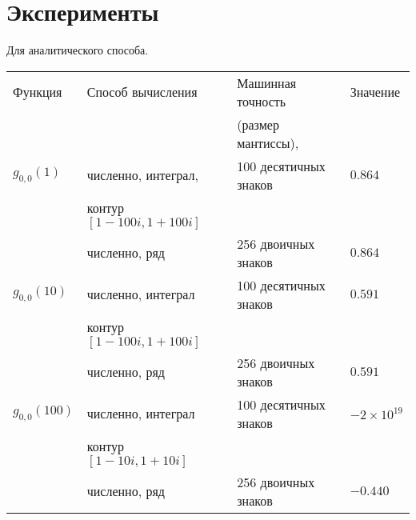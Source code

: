 \documentclass[../paper.tex]{subfiles}
\begin{document}
\chapter{Эксперименты}
%
Для аналитического способа.

\begin{tabular}{ l l l l }
\hline
    Функция        & Способ вычисления                              & Машинная точность                     & Значение                  \\ 
                   &                                                & (размер мантиссы),                    &                           \\
\hline%
    $g_{0,0}(1)$   & численно, интеграл,                            & 100 десятичных знаков                 & $ 0.864$                  \\
	           & контур $[1-100i, 1+100i]$                      &                                       &                           \\

	           & численно, ряд                                  & 256 двоичных знаков                   & $ 0.864$                  \\

    $g_{0,0}(10)$  & численно, интеграл                             & 100 десятичных знаков                 & $ 0.591$                  \\
                   & контур $[1-100i, 1+100i]$                      &                                       &                           \\

                   & численно, ряд                                  & 256 двоичных знаков                   & $ 0.591$                  \\

    $g_{0,0}(100)$ & численно, интеграл                             & 100 десятичных знаков                 & $-2 \times 10^{19}$       \\
	           & контур $[1-10i, 1+10i]$                        &                                       &                           \\
		   
                   & численно, ряд                                  & 256 двоичных знаков                   & $-0.440$                  \\
\hline
\end{tabular}
\end{document}
